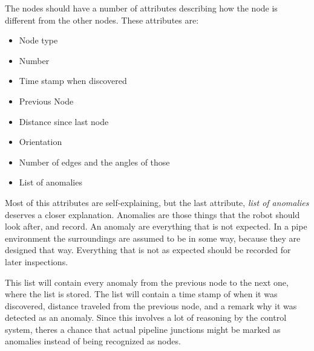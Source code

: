 The nodes should have a number of attributes describing how the node is different from the
other nodes. These attributes are:
\begin{itemize}
    \item Node type
    \item Number
    \item Time stamp when discovered
    \item Previous Node
    \item Distance since last node
    \item Orientation
    \item Number of edges and the angles of those
    \item List of anomalies
\end{itemize}

Most of this attributes are self-explaining, but the last attribute, \emph{list of
anomalies} deserves a closer explanation. 
Anomalies are those things that the robot should look after, and record. An anomaly are
everything that is not expected. In a pipe environment the surroundings are assumed to be
in some way, because they are designed that way. Everything that is not as expected should
be recorded for later inspections. 

This list will contain every anomaly from the previous node to the next one, where the
list is stored. The list will contain a time stamp of when it was discovered, distance
traveled from the previous node, and a remark why it was detected as an anomaly. Since
this involves a lot of reasoning by the control system, theres a chance that actual
pipeline junctions might be marked as anomalies instead of being recognized as nodes.

